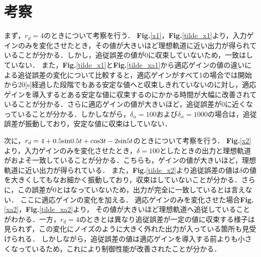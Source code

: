 \documentclass[a4paper,12pt]{jarticle}
\begin{document}
\section{考察}
まず，$ r_d = 4 $のときについて考察を行う．
{\bf Fig.}{\ref{x1}}，{\bf Fig.}{\ref{tilde_x1}}より，入力ゲインのみを変化させたとき，その値が大きいほど理想軌道に近い出力が得られていることが分かる．しかし，追従誤差の値が0に収束していないため，一致はしていない．
また，{\bf Fig.}{\ref{tilde_x1}}と{\bf Fig.}{\ref{tilde_xa1}}から適応ゲインの値の違いによる追従誤差の変化について比較すると，適応ゲインがすべて1の場合では開始から20[s]経過した段階でもある安定な値へと収束しきれていないのに対し，適応ゲインを導入するとある安定な値に収束するのにかかる時間が大幅に改善されていることが分かる．さらに適応ゲインの値が大きいほど，追従誤差が0に近くなっていることが分かる．しかしながら，$ \delta_{\alpha} = 100 $および$ \delta_{\alpha} = 1000 $の場合は，追従誤差が振動しており，安定な値に収束はしていない．

次に，$ r_d = 4 + 0.5{\rm sin}0.5t + {\rm cos}3t -2{\rm sin}5t $のときについて考察を行う．
{\bf Fig.}{\ref{x2}}より，入力ゲインのみを変化させたとき，$ \delta = 100 $としたときの出力と理想軌道がおよそ一致していることが分かる．こちらも，ゲインの値が大きいほど，理想軌道に近い出力が得られている．
また，{\bf Fig.}{\ref{tilde_x2}}より追従誤差の値は$ \delta $の値を大きくしてもなお細かく振動しており，収束はしていないことが分かる．さらに，この誤差が0とはなっていないため，出力が完全に一致しているとは言えない．
ここに適応ゲインの変化を加える．
適応ゲインのみを変化させた場合{\bf Fig.}{\ref{xa2}}，{\bf Fig.}{\ref{tilde_xa2}}より，
その値が大きいほど理想軌道へ追従していることがわかる．一方，$ r_d =4 $のときとは異なり追従誤差が一定の値に収束する様子は見られず，この変化にノイズのように大きく外れた出力が入っている箇所も見受けられる．
しかしながら，追従誤差の値は適応ゲインを導入する前よりも小さくなっているため，これにより制御性能が改善されたことが分かる．



\end{document}
